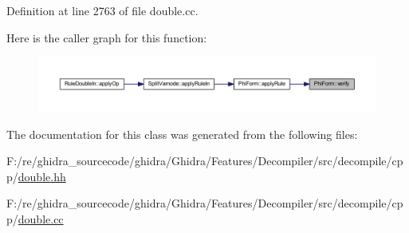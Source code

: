 Definition at line 2763 of file double.\+cc.

Here is the caller graph for this function\+:
\nopagebreak
\begin{figure}[H]
\begin{center}
\leavevmode
\includegraphics[width=350pt]{class_phi_form_ae7266e0446e1377f7547a6c81453fb4f_icgraph}
\end{center}
\end{figure}


The documentation for this class was generated from the following files\+:\begin{DoxyCompactItemize}
\item 
F\+:/re/ghidra\+\_\+sourcecode/ghidra/\+Ghidra/\+Features/\+Decompiler/src/decompile/cpp/\mbox{\hyperlink{double_8hh}{double.\+hh}}\item 
F\+:/re/ghidra\+\_\+sourcecode/ghidra/\+Ghidra/\+Features/\+Decompiler/src/decompile/cpp/\mbox{\hyperlink{double_8cc}{double.\+cc}}\end{DoxyCompactItemize}

